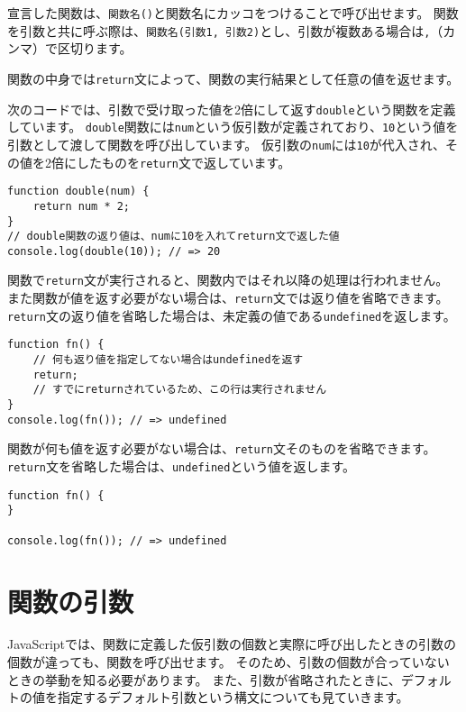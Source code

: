 \enlargethispage{\baselineskip}宣言した関数は、\texttt{関数名()}と関数名にカッコをつけることで呼び出せます。
関数を引数と共に呼ぶ際は、\texttt{関数名(引数1, 引数2)}とし、引数が複数ある場合は\texttt{,}（カンマ）で区切ります。

関数の中身では\texttt{return}文によって、関数の実行結果として任意の値を返せます。

次のコードでは、引数で受け取った値を2倍にして返す\texttt{double}という関数を定義しています。
\texttt{double}関数には\texttt{num}という仮引数が定義されており、\texttt{10}という値を引数として渡して関数を呼び出しています。
仮引数の\texttt{num}には\texttt{10}が代入され、その値を2倍にしたものを\texttt{return}文で返しています。

\begin{lstlisting}
function double(num) {
    return num * 2;
}
// double関数の返り値は、numに10を入れてreturn文で返した値
console.log(double(10)); // => 20
\end{lstlisting}

関数で\texttt{return}文が実行されると、関数内ではそれ以降の処理は行われません。
また関数が値を返す必要がない場合は、\texttt{return}文では返り値を省略できます。
\texttt{return}文の返り値を省略した場合は、未定義の値である\texttt{undefined}を返します。

\begin{lstlisting}
function fn() {
    // 何も返り値を指定してない場合はundefinedを返す
    return;
    // すでにreturnされているため、この行は実行されません
}
console.log(fn()); // => undefined
\end{lstlisting}

関数が何も値を返す必要がない場合は、\texttt{return}文そのものを省略できます。
\texttt{return}文を省略した場合は、\texttt{undefined}という値を返します。

\begin{lstlisting}
function fn() {
}

console.log(fn()); // => undefined
\end{lstlisting}

\hypertarget{function-arguments}{%
\section{関数の引数}\label{function-arguments}}

JavaScriptでは、関数に定義した仮引数の個数と実際に呼び出したときの引数の個数が違っても、関数を呼び出せます。
そのため、引数の個数が合っていないときの挙動を知る必要があります。
また、引数が省略されたときに、デフォルトの値を指定するデフォルト引数という構文についても見ていきます。

